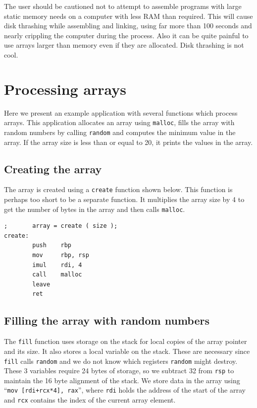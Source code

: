 \documentclass[11pt,b5paper]{book}
\begin{document}
The user should be cautioned not to attempt to assemble programs with large static memory needs on
a computer with less RAM than required.
This will cause disk thrashing while assembling and linking, using far more than 100 seconds and nearly crippling the computer during the process.
Also it can be quite painful to use arrays larger than memory even if they are allocated.
Disk thrashing is not cool.

\section{Processing arrays}

Here we present an example application with several functions which process
arrays.
This application allocates an array using {\tt malloc}, fills the array with 
random numbers by calling {\tt random} and computes the minimum value in 
the array.
If the array size is less than or equal to 20, it prints the values in the array.

\subsection{Creating the array}

The array is created using a {\tt create} function shown below.
This function is perhaps too short to be a separate function.
It multiplies the array size by 4 to get the number of bytes in the array
and then calls {\tt malloc}.

\begin{verbatim}
;       array = create ( size );
create:
        push    rbp
        mov     rbp, rsp
        imul    rdi, 4
        call    malloc
        leave
        ret
\end{verbatim}

\subsection{Filling the array with random numbers}

The {\tt fill} function uses storage on the stack for local copies of the
array pointer and its size.
It also stores a local variable on the stack.
These are necessary since {\tt fill} calls {\tt random} and we do not know
which registers {\tt random} might destroy. 
These 3 variables require 24 bytes of storage, so we subtract 32 from {\tt rsp}
to maintain the 16 byte alignment of the stack.
We store data in the array using ``{\tt mov [rdi+rcx*4], rax}'', where {\tt rdi}
holds the address of the start of the array and {\tt rcx} contains the index
of the current array element.
\end{document}
